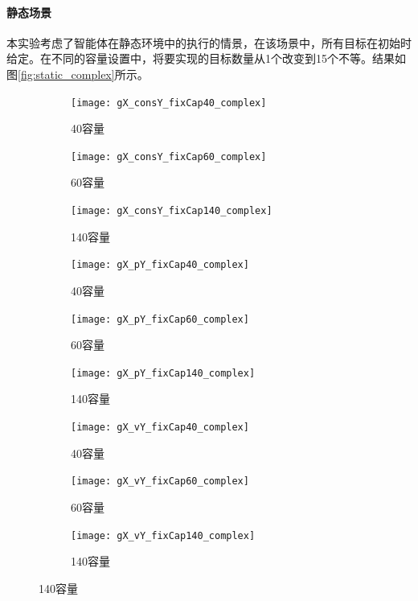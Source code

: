 \paragraph{静态场景}
本实验考虑了智能体在静态环境中的执行的情景，在该场景中，所有目标在初始时给定。在不同的容量设置中，将要实现的目标数量从1个改变到15个不等。结果如图\ref{fig:static_complex}所示。

\begin{figure}[H]
\centering
\begin{subfigure}{.32\textwidth}
  \centering
  \texttt{[image: gX\_consY\_fixCap40\_complex]}
  \caption{40容量}
  \captionsetup{justification=centering}
\end{subfigure}
\begin{subfigure}{.32\textwidth}
  \centering
  \texttt{[image: gX\_consY\_fixCap60\_complex]}
  \caption{60容量}
  \captionsetup{justification=centering}
\end{subfigure}
\begin{subfigure}{.32\textwidth}
  \centering
  \texttt{[image: gX\_consY\_fixCap140\_complex]}
  \caption{140容量}
  \captionsetup{justification=centering}
\end{subfigure}
\begin{subfigure}{.32\textwidth}
  \centering
  \texttt{[image: gX\_pY\_fixCap40\_complex]}
  \caption{40容量}
  \captionsetup{justification=centering}
\end{subfigure}
\begin{subfigure}{.32\textwidth}
  \centering
  \texttt{[image: gX\_pY\_fixCap60\_complex]}
  \caption{60容量}
  \captionsetup{justification=centering}
\end{subfigure}
\begin{subfigure}{.32\textwidth}
  \centering
  \texttt{[image: gX\_pY\_fixCap140\_complex]}
  \caption{140容量}
  \captionsetup{justification=centering}
\end{subfigure}
\begin{subfigure}{.32\textwidth}
  \centering
  \texttt{[image: gX\_vY\_fixCap40\_complex]}
  \caption{40容量}
  \captionsetup{justification=centering}
\end{subfigure}
\begin{subfigure}{.32\textwidth}
  \centering
  \texttt{[image: gX\_vY\_fixCap60\_complex]}
  \caption{60容量}
  \captionsetup{justification=centering}
\end{subfigure}
\begin{subfigure}{.32\textwidth}
  \centering
  \texttt{[image: gX\_vY\_fixCap140\_complex]}
  \caption{140容量}
  \captionsetup{justification=centering}
\end{subfigure}
\captionsetup{justification=centering}
\label{fig:dynamic_complex}
\end{figure}
